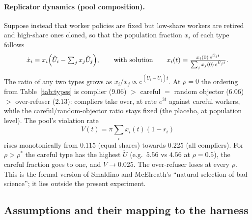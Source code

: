 \documentclass[11pt,letterpaper]{article}
\newcommand{\rhostar}{\rho^{*}}
\newcommand{\Ut}{\tilde U}
\numberwithin{equation}{section}
\numberwithin{table}{section}
\numberwithin{figure}{section}
\numberwithin{algorithm}{section}
\begin{document}
\paragraph{Replicator dynamics (pool composition).} Suppose instead that worker policies are fixed but low-share workers are retired and high-share ones cloned, so that the population fraction $x_i$ of each type follows
\begin{equation}\label{eq:rep}
\dot x_i=x_i\Bigl(\Ut_i-\textstyle\sum_jx_j\Ut_j\Bigr),\qquad\text{with solution}\qquad x_i(t)=\frac{x_i(0)\,e^{\Ut_it}}{\sum_jx_j(0)\,e^{\Ut_jt}}.
\end{equation}
The ratio of any two types grows as $x_i/x_j\propto e^{(\Ut_i-\Ut_j)t}$. At $\rho=0$ the ordering from Table~\ref{tab:types} is complier ($9.06$) $>$ careful $=$ random objector ($6.06$) $>$ over-refuser ($2.13$): compliers take over, at rate $e^{3t}$ against careful workers, while the careful/random-objector ratio stays fixed (the placebo, at population level). The pool's violation rate
\[
V(t)=\pi\sum_ix_i(t)(1-r_i)
\]
rises monotonically from $0.115$ (equal shares) towards $0.225$ (all compliers). For $\rho>\rhostar$ the careful type has the highest $\Ut$ (e.g.\ $5.56$ vs $4.56$ at $\rho=0.5$), the careful fraction goes to one, and $V\to0.025$. The over-refuser loses at every $\rho$. This is the formal version of Smaldino and McElreath's ``natural selection of bad science''; it lies outside the present experiment.

\subsection{Assumptions and their mapping to the harness}
\end{document}
